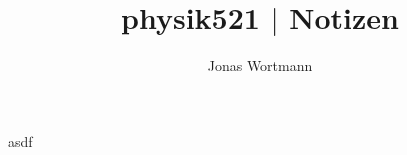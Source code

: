 \documentclass[a4paper,10pt]{article}
\numberwithin{equation}{section}
\begin{document}

\iffalse\begin{titlepage}
        \title{}
        \author[1]{\thanks}
        \affil{}
\end{titlepage}\fi

\title{physik521 $|$ Notizen}
\author{Jonas Wortmann}

\maketitle
{}


\clearpage


\fancyhead[R]{\leftmark}
\fancyhead[L]{\thepage}
\fancyfoot[C]{}

\tableofcontents


\clearpage




asdf



%
%

\end{document}
